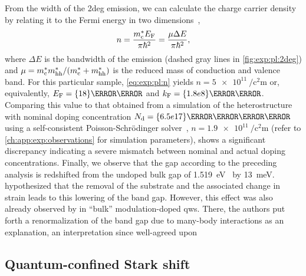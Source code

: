 From the width of the \gls{2deg} emission, we can calculate the charge carrier density by relating it to the Fermi energy in two dimensions~\cite{Pinczuk1984,Ihn2009},
\begin{equation}\label{eq:exp:pl:n}
    n = \frac{m^{\ast}_{\mathrm{c}}E_{\mathrm{F}}}{\pi\hbar^2} = \frac{\mu\Delta E}{\pi\hbar^2},
\end{equation}
where $\Delta E$ is the bandwidth of the emission (dashed gray lines in \cref{fig:exp:pl:2deg}) and $\mu = m^{\ast}_{\mathrm{c}}m^{\ast}_{\mathrm{hh}}/(m^{\ast}_{\mathrm{c}} + m^{\ast}_{\mathrm{hh}})$ is the reduced mass of conduction and valence band.
For this particular sample, \cref{eq:exp:pl:n} yields $n = \qty{5e11}{\per\square\centi\meter}$ or, equivalently, $E_{\mr{F}} = \qty{18}{\milli\electronvolt}$ and $k_{\mr{F}} = \qty{1.8e8}{\per\meter}$.
Comparing this value to that obtained from a simulation of the heterostructure with nominal doping concentration $N_{\mr{d}} = \qty{6.5e17}{\per\cubic\centi\meter}$ using a self-consistent Poisson-Schrödinger solver~\cite{PoissonSchroedinger}, $n = \qty{1.9e11}{\per\square\centi\meter}$ (refer to \cref{ch:app:exp:observations} for simulation parameters), shows a significant discrepancy indicating a severe mismatch between nominal and actual doping concentrations.
Finally, we observe that the gap according to the preceding analysis is redshifted from the undoped bulk gap of \qty{1.519}{\electronvolt}~\cite{Vurgaftman2001} by \qty{13}{\milli\electronvolt}.
 hypothesized that the removal of the  substrate and the associated change in strain leads to this lowering of the band gap.
However, this effect was also already observed by \citet{Pinczuk1984} in \enquote{bulk} modulation-doped  \glspl{qw}.
There, the authors put forth a renormalization of the band gap due to many-body interactions as an explanation, an interpretation since well-agreed upon~\cite{Jain1992}

\subsection{Quantum-confined Stark shift}\label{subsec:exp:observations:pl:qcse}

